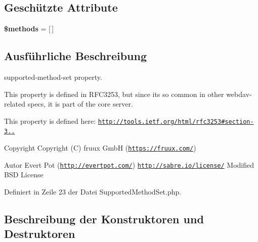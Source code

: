 \subsection*{Geschützte Attribute}
\begin{DoxyCompactItemize}
\item 
\mbox{\label{class_sabre_1_1_d_a_v_1_1_xml_1_1_property_1_1_supported_method_set_a237238a68f54b8fe6cd82aefdf05c0b4}} 
{\bfseries \$methods} = \mbox{[}$\,$\mbox{]}
\end{DoxyCompactItemize}


\subsection{Ausführliche Beschreibung}
supported-\/method-\/set property.

This property is defined in R\+F\+C3253, but since it\textquotesingle{}s so common in other webdav-\/related specs, it is part of the core server.

This property is defined here\+: \href{http://tools.ietf.org/html/rfc3253#section-3.1.3}{\tt http\+://tools.\+ietf.\+org/html/rfc3253\#section-\/3..}

\begin{DoxyCopyright}{Copyright}
Copyright (C) fruux GmbH (\href{https://fruux.com/}{\tt https\+://fruux.\+com/}) 
\end{DoxyCopyright}
\begin{DoxyAuthor}{Autor}
Evert Pot (\href{http://evertpot.com/}{\tt http\+://evertpot.\+com/})  \href{http://sabre.io/license/}{\tt http\+://sabre.\+io/license/} Modified B\+SD License 
\end{DoxyAuthor}


Definiert in Zeile 23 der Datei Supported\+Method\+Set.\+php.



\subsection{Beschreibung der Konstruktoren und Destruktoren}
\mbox{\label{class_sabre_1_1_d_a_v_1_1_xml_1_1_property_1_1_supported_method_set_a559bbd4ca693edfe3e3a7986e04d2912}} 
